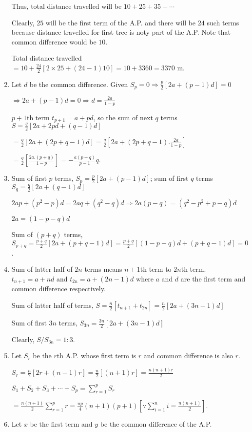 \begin{enumerate}
  Thus, total distance travelled will be $10 + 25 + 35 + \cdots$

  Clearly, $25$ will be the first term of the A.P. and there will be $24$ such terms because distance travelled
  for first tree is noty part of the A.P. Note that common difference would be $10$.

  Total distance travelled $= 10 + \frac{24}{2}[2\times25 + (24 - 1)10] = 10 + 3360 = 3370$ m.
\item Let $d$ be the common difference. Given $S_p = 0 \Rightarrow \frac{p}{2}[2a + (p - 1)d] = 0$

  $\Rightarrow 2a + (p - 1)d = 0 \Rightarrow d = \frac{2a}{1 - p}$

  $p + 1$th term $t_{p + 1} = a + pd$, so the sum of next $q$ terms $S = \frac{q}{2}[2a + 2pd + (q - 1)d]$

  $= \frac{q}{2}[2a + (2p + q - 1)d] = \frac{q}{2}\left[2a + (2p + q - 1).\frac{2a}{1 - p}\right]$

  $= \frac{q}{2}\left[\frac{2a.(p + q)}{1 - p}\right] = -\frac{a(p + q)}{p - 1}q$.
\item Sum of first $p$ terms, $S_p = \frac{p}{2}[2a + (p - 1)d]$; sum of first $q$ terms $S_q = \frac{q}{2}[2a + (q - 1)d]$

  $2ap + (p^2 - p)d = 2aq + (q^2 - q)d \Rightarrow 2a(p - q) = (q^2 - p^2 + p - q)d$

  $2a = (1 - p - q)d$

  Sum of $(p + q)$ terms, $S_{p + q} = \frac{p + q}{2}[2a + (p + q - 1)d] = \frac{p + q}{2}[(1 - p - q)d + (p + q - 1)d] = 0$.
\item Sum of latter half of $2n$ terms means $n + 1$th term to $2n$th term. $t_{n + 1} = a + nd$ and $t_{2n} = a + (2n - 1)d$
  where $a$ and $d$ are the first term and common difference respectively.

  Sum of latter half of terms, $S = \frac{n}{2}[t_{n + 1} + t_{2n}] = \frac{n}{2}[2a + (3n - 1)d]$

  Sum of first $3n$ terms, $S_{3n} = \frac{3n}{2}[2a + (3n - 1)d]$

  Clearly, $S/S_{3n} = 1:3$.
\item Let $S_r$ be the $r$th A.P. whose first term is $r$ and common difference is also $r$.

  $S_r = \frac{n}{2}[2r + (n - 1)r] = \frac{n}{2}[(n + 1)r] = \frac{n(n + 1)r}{2}$

  $S_1 + S_2 + S_3 + \cdots + S_p = \displaystyle\sum_{r=1}^pS_r$

  $= \frac{n(n + 1)}{2}\displaystyle\sum_{r = 1}^pr = \frac{np}{4}(n + 1)(p + 1)\left[\because\displaystyle\sum_{i=1}^ni =
  \frac{n(n + 1)}{2}\right]$.
\item Let $x$ be the first term and $y$ be the common difference of the A.P.


\end{enumerate}
